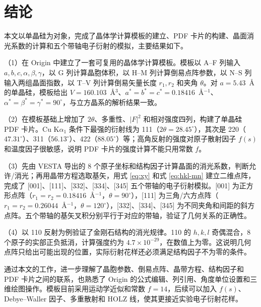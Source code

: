 \section{结\hspace{0.5em}论}

本文以单晶硅为对象，完成了晶体学计算模板的建立、PDF 卡片的构建、晶面消光系数的计算和五个带轴电子衍射的模拟，主要结果如下。

（1）在 Origin 中建立了一套可复用的晶体学计算模板。模板以 A--F 列输入 $a,b,c,\alpha,\beta,\gamma$，以 G 列计算晶胞体积，以 H--M 列计算倒易点阵参数，以 N--S 列输入两组晶面指数，以 T--V 列计算倒易矢量长度 $r_1,r_2$ 和夹角 $\theta$。对 $a=5.43$~\AA 的单晶硅，模板给出 $V=160.103$~\AA$^3$、$a^*=b^*=c^*=0.18416$~\AA$^{-1}$、$\alpha^*=\beta^*=\gamma^*=90^\circ$，与立方晶系的解析结果一致。

（2）在模板基础上增加了 $2\theta$、多重性、$|F|^2$ 和相对强度四列，构建了单晶硅 PDF 卡片。Cu K$\alpha_1$ 条件下最强的衍射线为 111（$2\theta=28.45^\circ$），其次是 220（$47.31^\circ$）、311（$56.13^\circ$）、422（$88.05^\circ$）等；高角反射的强度对原子散射因子 $f(s)$ 和温度因子很敏感，说明 PDF 卡片的强度计算不能只用常数 $f$。

（3）先由 VESTA 导出的 8 个原子坐标和结构因子计算晶面的消光系数，判断允许/消光；再用晶带方程选取基矢，用式 \eqref{eq:xy} 和式 \eqref{eq:hkl-mn} 建立二维点阵，完成了 [001]、[111]、[332]、[334]、[345] 五个带轴的电子衍射模拟。[001] 为正方形点阵（$r_1=r_2=0.18416$~\AA$^{-1}$，$\theta=90^\circ$），[111] 为三角/六方点阵（$r_1=r_2=0.26044$~\AA$^{-1}$，$\theta=120^\circ$），[332]、[334]、[345] 为不同夹角和间距的斜方点阵。五个带轴的基矢叉积分别平行于对应的带轴，验证了几何关系的正确性。

（4）以 110 反射为例验证了金刚石结构的消光规律。110 的 $h,k,l$ 奇偶混合，8 个原子的实部正负抵消，计算强度约为 $4.7\times10^{-29}$，在数值上为零。这说明几何点阵只给出可能出现的位置，实际衍射花样还必须满足结构因子不为零的条件。

通过本文的工作，进一步理解了晶胞参数、倒易点阵、晶带方程、结构因子和 PDF 卡片之间的联系，也熟悉了 Origin 的公式编辑、列引用、角度单位设置和三维绘图操作。模板目前采用运动学近似和常数 $f=14$，后续可以加入 $f(s)$、Debye--Waller 因子、多重散射和 HOLZ 线，使其更接近实验电子衍射花样。
